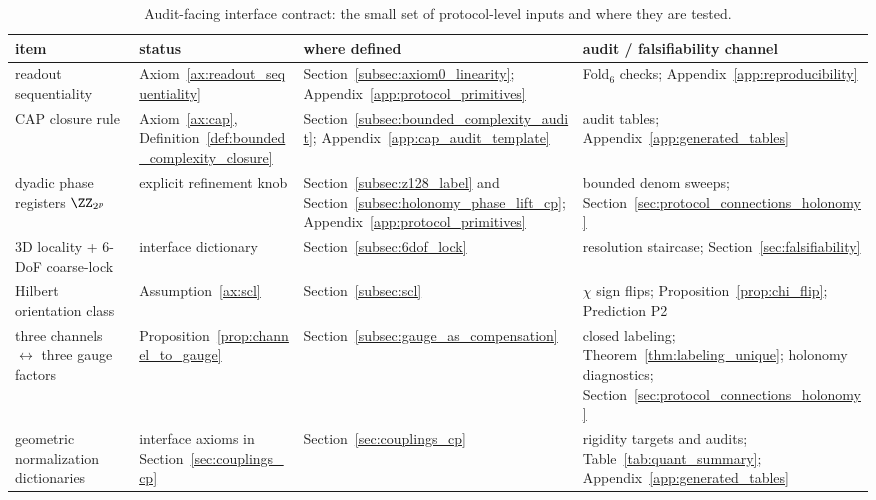 \begin{table}[t]
\centering
\scriptsize
\setlength{\tabcolsep}{5.5pt}
\renewcommand{\arraystretch}{1.15}
\begin{tabular}{p{} p{} p{} p{}}
\toprule
item & status & where defined & audit / falsifiability channel \\
\midrule
readout sequentiality & Axiom~\ref{ax:readout_sequentiality} & Section~\ref{subsec:axiom0_linearity}; Appendix~\ref{app:protocol_primitives} & Fold$_6$ checks; Appendix~\ref{app:reproducibility} \\
CAP closure rule & Axiom~\ref{ax:cap}, Definition~\ref{def:bounded_complexity_closure} & Section~\ref{subsec:bounded_complexity_audit}; Appendix~\ref{app:cap_audit_template} & audit tables; Appendix~\ref{app:generated_tables} \\
dyadic phase registers $\ZZ_{2^p}$ & explicit refinement knob & Section~\ref{subsec:z128_label} and Section~\ref{subsec:holonomy_phase_lift_cp}; Appendix~\ref{app:protocol_primitives} & bounded denom sweeps; Section~\ref{sec:protocol_connections_holonomy} \\
3D locality + 6-DoF coarse-lock & interface dictionary & Section~\ref{subsec:6dof_lock} & resolution staircase; Section~\ref{sec:falsifiability} \\
Hilbert orientation class & Assumption~\ref{ax:scl} & Section~\ref{subsec:scl} & $\chi$ sign flips; Proposition~\ref{prop:chi_flip}; Prediction P2 \\
three channels $\leftrightarrow$ three gauge factors & Proposition~\ref{prop:channel_to_gauge} & Section~\ref{subsec:gauge_as_compensation} & closed labeling; Theorem~\ref{thm:labeling_unique}; holonomy diagnostics; Section~\ref{sec:protocol_connections_holonomy} \\
geometric normalization dictionaries & interface axioms in Section~\ref{sec:couplings_cp} & Section~\ref{sec:couplings_cp} & rigidity targets and audits; Table~\ref{tab:quant_summary}; Appendix~\ref{app:generated_tables} \\
\bottomrule
\end{tabular}
\caption{Audit-facing interface contract: the small set of protocol-level inputs and where they are tested.}
\label{tab:audit_facing_contract}
\end{table}

